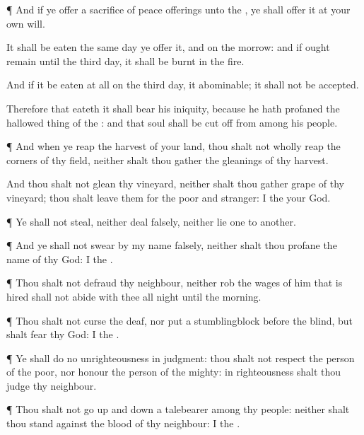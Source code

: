 {\par }{\PP {}¶ And if ye
offer a
sacrifice of peace
offerings unto the
{}, ye shall
offer it at your own
will.

It shall be
eaten the same
day ye
offer it, and on the
morrow: and if ought
remain until the
third
day, it shall be
burnt in the
fire.

And if it be
eaten at
all on the
third
day, it
{}
abominable; it shall not be
accepted.

Therefore
{} that
eateth it shall
bear his
iniquity, because he hath
profaned the hallowed
thing of the
{}: and that
soul shall be cut
off from among his
people.


\par }{\PP {}¶ And when ye
reap the
harvest of your
land, thou shalt not wholly
reap the
corners of thy
field, neither shalt thou
gather the
gleanings of thy
harvest.

And thou shalt not
glean thy
vineyard, neither shalt thou
gather
{}
grape of thy
vineyard; thou shalt
leave them for the
poor and
stranger: I
{} the
{} your
God.


\par }{\PP {}¶ Ye shall not
steal, neither deal
falsely, neither
lie
one to
another.


\par }{\PP {}¶ And ye shall not
swear by my
name
falsely, neither shalt thou
profane the
name of thy
God: I
{} the
{}.


\par }{\PP {}¶ Thou shalt not
defraud thy
neighbour, neither
rob
{} the
wages of him that is
hired shall not
abide with thee all night until the
morning.


\par }{\PP {}¶ Thou shalt not
curse the
deaf, nor
put a
stumblingblock
before the
blind, but shalt
fear thy
God: I
{} the
{}.


\par }{\PP {}¶ Ye shall
do no
unrighteousness in
judgment: thou shalt not
respect the
person of the
poor, nor
honour the
person of the
mighty:
{} in
righteousness shalt thou
judge thy
neighbour.


\par }{\PP {}¶ Thou shalt not
go up and down
{} a
talebearer among thy
people: neither shalt thou
stand against the
blood of thy
neighbour: I
{} the
{}.


}

